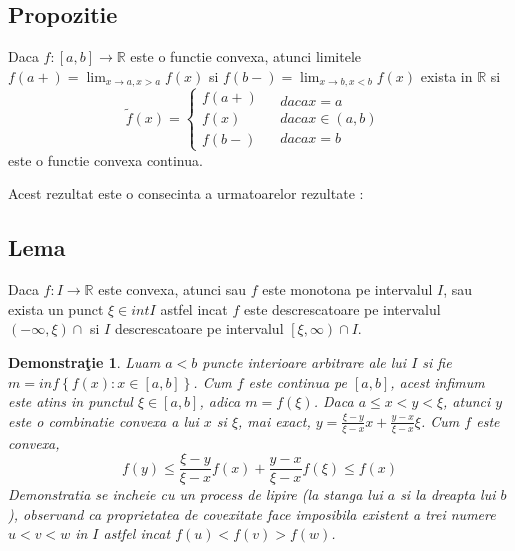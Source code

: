 \documentclass[a4paper,12pt,oneside]{report}
\newtheorem{demonstration}{Demonstra\c tie}
\begin{document}
\subsection{Propozitie}
Daca \(f: \left [ a, b \right ]\rightarrow \mathbb{R}\) este o functie convexa, atunci limitele \(f\left ( a+ \right ) = \lim_{x\rightarrow a, x> a}f\left ( x \right )\)  si \(f\left ( b- \right ) = \lim_{x\rightarrow b, x< b}f\left ( x \right )\) exista in \(\mathbb{R}\) si
\begin{displaymath}
  \tilde{f}\left ( x \right )= \left\{\begin{matrix}
f\left ( a+ \right ) & \\ 
 f\left ( x \right )& \\ 
 f\left ( b- \right )& 
\end{matrix} \begin{matrix}
daca x= a & \\ 
daca x\in \left ( a,b \right ) & \\ 
 daca x= b& 
\end{matrix}\right.
\end{displaymath}
 este o functie convexa continua. 

	Acest rezultat este o consecinta a urmatoarelor rezultate :


\subsection{Lema}

Daca \(f: I \rightarrow \mathbb{R}\) este convexa, atunci sau \(f\) este monotona pe intervalul \(I\), sau exista un punct \(\xi \in int I\) astfel incat \(f\) este descrescatoare pe intervalul \(\left ( -\infty , \xi  \right )\cap\) si \(I\) descrescatoare pe intervalul \(\left[\xi , \infty  \right )\cap I\).

\begin{demonstration}
Luam \(a < b\) puncte interioare arbitrare ale lui \(I\) si fie \(m = inf\left \{ f\left ( x \right )  : x\in \left [ a,b \right ]\right \}\). Cum \(f\) este continua pe \(\left [ a,b \right ]\), acest infimum este atins in punctul \(\xi \in \left [ a,b \right ]\), adica \(m = f\left ( \xi  \right )\).
Daca \(a \leq x <  y< \xi\), atunci \(y\) este o combinatie convexa a lui \(x\) si \(\xi\), mai exact, \(y = \frac{\xi -y}{\xi -x}x + \frac{y - x}{\xi -x}\xi\). Cum \(f\) este convexa, 
\begin{displaymath}
  f\left ( y \right )\leq \frac{\xi -y}{\xi -x}f\left ( x \right )+ \frac{y-x}{\xi -x}f\left ( \xi  \right )\leq f\left ( x \right ) 
\end{displaymath}
Demonstratia se incheie cu un process de lipire (la stanga lui \(a\) si la dreapta lui \(b\)), observand ca proprietatea de covexitate face imposibila existent a trei numere \(u < v < w\) in \(I\) astfel incat \(f\left ( u \right ) < f\left ( v \right )> f\left ( w \right )\). 
\end{demonstration}
\end{document}
